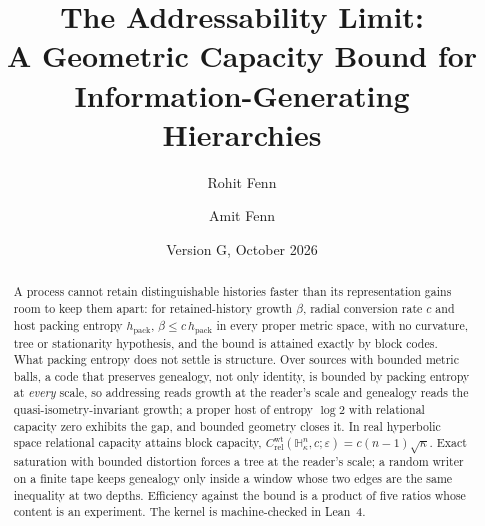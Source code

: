 \documentclass[11pt,reqno]{amsart}
\theoremstyle{plain}
\theoremstyle{definition}
\newcommand{\hpack}{h_{\mathrm{pack}}}
\newcommand{\Crel}{C_{\mathrm{rel}}}
\newcommand{\Hk}{\mathbb{H}^n_\kappa}
\newcommand{\eps}{\varepsilon}
\begin{document}
\title[The Addressability Limit]{The Addressability Limit:\\ A Geometric Capacity Bound for Information-Generating Hierarchies}

\author{Rohit Fenn}
\author{Amit Fenn}
\address{Sentry Bio, Inc., USA}

\date{Version G, October 2026}

\begin{abstract}
A process cannot retain distinguishable histories faster than its representation gains room to keep them apart: for retained-history growth $\beta$, radial conversion rate $c$ and host packing entropy $\hpack$, $\beta\le c\,\hpack$ in every proper metric space, with no curvature, tree or stationarity hypothesis, and the bound is attained exactly by block codes. What packing entropy does not settle is structure. Over sources with bounded metric balls, a code that preserves genealogy, not only identity, is bounded by packing entropy at \emph{every} scale, so addressing reads growth at the reader's scale and genealogy reads the quasi-isometry-invariant growth; a proper host of entropy $\log2$ with relational capacity zero exhibits the gap, and bounded geometry closes it. In real hyperbolic space relational capacity attains block capacity, $\Crel^{\mathrm{wt}}(\Hk,c;\eps)=c(n-1)\sqrt\kappa$. Exact saturation with bounded distortion forces a tree at the reader's scale; a random writer on a finite tape keeps genealogy only inside a window whose two edges are the same inequality at two depths. Efficiency against the bound is a product of five ratios whose content is an experiment. The kernel is machine-checked in Lean~4.
\end{abstract}

\maketitle
\end{document}
